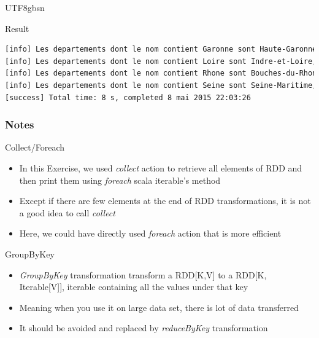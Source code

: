 \documentclass[slidetop,9pt,utf8]{beamer}
\begin{document}
\begin{CJK}{UTF8}{gbsn}
\begin{frame}[fragile]
  \begin{block}{Result}
    \begin{lstlisting}[language=bash, style=terminal]
[info] Les departements dont le nom contient Garonne sont Haute-Garonne, Lot-et-Garonne, Tarn-et-Garonne
[info] Les departements dont le nom contient Loire sont Indre-et-Loire, Loire, Haute-Loire, Loire-Atlantique, Loiret, Maine-et-Loire, Saone-et-Loire
[info] Les departements dont le nom contient Rhone sont Bouches-du-Rhone, Rhone
[info] Les departements dont le nom contient Seine sont Seine-Maritime, Seine-et-Marne, Hauts-de-Seine, Seine-Saint-Denis
[success] Total time: 8 s, completed 8 mai 2015 22:03:26
    \end{lstlisting}
  \end{block}

\end{frame}

\begin{frame}
  \frametitle{Notes}

  \begin{exampleblock}{Collect/Foreach}
    \begin{itemize}
      \item In this Exercise, we used \textit{collect} action to retrieve all elements of RDD and then print them using \textit{foreach} scala iterable's method
      \item Except if there are few elements at the end of RDD transformations, it is not a good idea to call \textit{collect}
      \item Here, we could have directly used \textit{foreach} action that is more efficient
    \end{itemize}
  \end{exampleblock}

  \begin{exampleblock}{GroupByKey}
    \begin{itemize}
      \item \textit{GroupByKey} transformation transform a RDD[K,V] to a RDD[K, Iterable[V]], iterable containing all the values under that key
      \item Meaning when you use it on large data set, there is lot of data transferred
      \item It should be avoided and replaced by \textit{reduceByKey} transformation
    \end{itemize}
  \end{exampleblock}

\end{frame}


\end{CJK}
\end{document}
